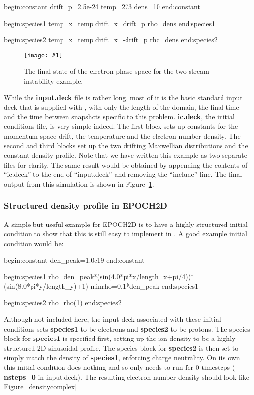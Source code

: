 \documentclass[12pt,a4paper]{article}
\newcommand{\inlineemph}[1]{{\color{warwicklight} \bf{#1}}}
\newcommand{\EPOCH}{{\color{warwickdark}\fontfamily{phv}\selectfont{EPOCH}}}
\newcommand{\scaledcapimage}[4]
  {{\begin{figure}[hbt!]\centering\texttt{[image: \#1]}\caption{#3}
    \label{#2} \end{figure}}}
\newenvironment{lboxverbatim}[1]{
\setlength{\FrameSep}{0pt}
\def\FrameCommand{\fboxsep=0pt \colorbox{shadecolor}}
\MakeFramed{\FrameRestore}
\vspace{-13.5pt}
\fvset{label=#1}
\boxverb
}{
\endboxverb
\vspace{-13.5pt}
\endMakeFramed
}
\begin{document}
\begin{lboxverbatim}{ic.deck}
begin:constant
   drift_p=2.5e-24
   temp=273
   dens=10
end:constant

begin:species1
   temp_x=temp
   drift_x=drift_p
   rho=dens
end:species1

begin:species2
   temp_x=temp
   drift_x=-drift_p
   rho=dens
end:species2
\end{lboxverbatim}

\scaledcapimage{./images/late}{tsilate}{The final state of the electron
  phase space for the two stream instability example.}{0.4}

While the \inlineemph{input.deck} file is rather long, most of it is the basic
standard input deck that is supplied with {\EPOCH}, with only the length of the
domain, the final time and the time between snapshots specific to this
problem. \inlineemph{ic.deck}, the initial conditions file, is very simple
indeed. The first block sets up constants for the momentum space drift, the
temperature and the electron number density. The second and third blocks set up
the two drifting Maxwellian distributions and the constant density profile.
Note that we have written this example as two separate files for clarity. The
same result would be obtained by appending the contents of ``ic.deck'' to
the end of ``input.deck'' and removing the ``include'' line.
The final output from this simulation is shown in Figure~\ref{tsilate}.

\subsubsection{Structured density profile in EPOCH2D}
A simple but useful example for EPOCH2D is to have a highly structured initial
condition to show that this is still easy to implement in {\EPOCH}. A good
example initial condition would be:
\begin{lboxverbatim}{ic.deck}
begin:constant
  den_peak=1.0e19
end:constant

begin:species1
  rho=den_peak*(sin(4.0*pi*x/length_x+pi/4))*(sin(8.0*pi*y/length_y)+1)
  minrho=0.1*den_peak
end:species1

begin:species2
  rho=rho(1)
end:species2
\end{lboxverbatim}

Although not included here, the input deck associated with these initial
conditions sets \inlineemph{species1} to be electrons and \inlineemph{species2}
to be protons. The species block for \inlineemph{species1} is specified
first, setting up the ion density to be a highly structured 2D sinusoidal
profile. The species block for \inlineemph{species2} is then set to simply
match the density of \inlineemph{species1}, enforcing charge neutrality. On
its own this initial condition does nothing and so only needs to run for 0
timesteps (\inlineemph{nsteps=0} in input.deck). The resulting electron number
density should look like Figure~\ref{densitycomplex}
\end{document}
